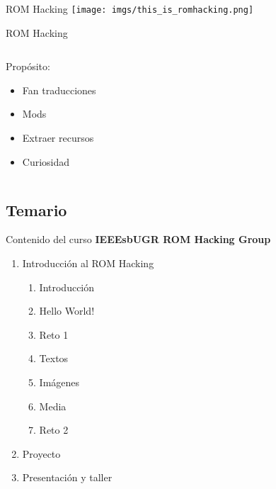 \begin{frame}{ROM Hacking}
    \texttt{[image: imgs/this\_is\_romhacking.png]}
\end{frame}

\begin{frame}{ROM Hacking}
    \begin{columns}
    \begin{column}{0.35\textwidth}
        Propósito:
        \begin{itemize}
            \item<2-> Fan traducciones
            \item<3-> Mods
            \item<4-> Extraer recursos
            \item<5-> Curiosidad
        \end{itemize}
    \end{column}
    \begin{column}{0.65\textwidth}
        \centering
    \end{column}
    \end{columns}
\end{frame}

\subsection{Temario}
\begin{frame}[t]{Contenido del curso}
    \centering
    {\Large \textbf{IEEEsbUGR ROM Hacking Group}}
    \vfill
    \setlength{\leftmargini}{8em}
    \begin{enumerate}
        \addtolength{\itemsep}{10pt}
        \item Introducción al ROM Hacking
        \begin{enumerate}
            \item Introducción
            \item Hello World!
            \item Reto 1
            \item Textos
            \item Imágenes
            \item Media
            \item Reto 2
        \end{enumerate}
        \item Proyecto
        \item Presentación y taller
    \end{enumerate}
\end{frame}
